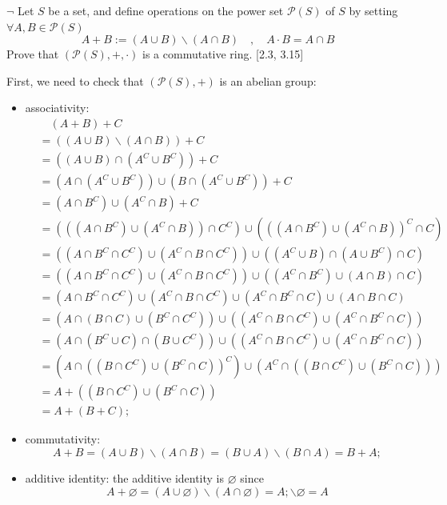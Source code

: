\documentclass[12pt,letterpaper,boxed]{hmcpset}
\begin{document}
\begin{problem}[1.2]
	$\neg$ Let $S$ be a set, and define operations on the power set $\mathscr{P}(S)$ of $S$ by setting $\forall A,B \in \mathscr{P}(S)$
	\[
	A+B :=(A \cup B) \backslash(A \cap B) \quad, \quad A \cdot B=A \cap B
	\]
	Prove that $(\mathscr{P}(S),+,\cdot)$ is a commutative ring. [2.3, 3.15]
\end{problem}
\begin{solution}
	First, we need to check that $(\mathscr{P}(S),+)$ is an abelian group:
	\begin{itemize}
		\item associativity:	
		\begin{align*}
		&\hspace{1em}(A+B)+C\\
		&=((A \cup B) \backslash(A \cap B))+C\\
	    &=((A \cup B) \cap(A^C \cup B^C))+C\\
	    &=(A\cap(A^C \cup B^C) )\cup (B\cap(A^C \cup B^C)) +C\\
	    &=(A \cap B^C) \cup(A^C \cap B)+C\\
	    &=(((A \cap B^C) \cup(A^C \cap B)) \cap C^C) \cup(((A \cap B^C) \cup(A^C \cap B))^C \cap C)\\
	    &=((A \cap B^C\cap C^C )\cup(A^C \cap B\cap C^C) ) \cup((A^C \cup B) \cap(A\cup B^C)\cap C)\\
	    &=((A \cap B^C\cap C^C )\cup(A^C \cap B\cap C^C) ) \cup((A^C\cap B^C) \cup( A\cap B) \cap C)\\
	    &=(A \cap B^C\cap C^C )\cup(A^C \cap B\cap C^C)  \cup(A^C\cap B^C\cap C) \cup( A\cap B\cap C) \\
	    &=(A \cap (B \cap C) \cup(B^C \cap C^C)) \cup((A^C \cap B \cap C^C) \cup (A^C \cap B^C \cap C))\\
	    &=(A \cap (B^C \cup C) \cap(B \cup C^C)) \cup((A^C \cap B \cap C^C) \cup (A^C \cap B^C \cap C))\\
	    &=(A \cap ((B \cap C^C) \cup(B^C \cap C))^C) \cup(A^C \cap ((B \cap C^C) \cup(B^C \cap C)))\\
	    &=A+((B \cap C^C) \cup(B^C \cap C))\\
	    &=A+(B+C);
		\end{align*}
		\item commutativity:
		\[
		A+B =(A \cup B) \backslash(A \cap B)=(B \cup A) \backslash(B \cap A)= B+A;
		\]
		\item additive identity: the additive identity is $\varnothing$ since
		\[
		A+\varnothing=(A \cup \varnothing) \backslash(A \cap \varnothing)=A; \backslash\varnothing=A
\]
\end{itemize}
\end{solution}
\end{document}
